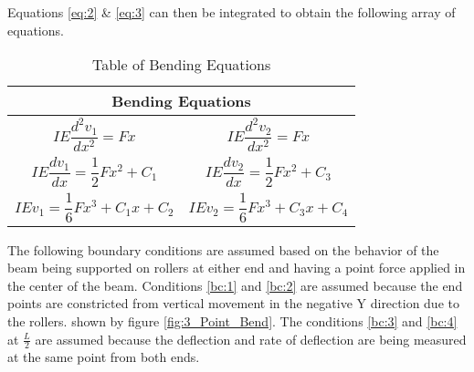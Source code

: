 Equations \ref{eq:2} \& \ref{eq:3} can then be integrated to obtain the following array of equations.

\begin{table} [h]
	\centering
	\begin{tabularx}{\textwidth}{| X X |}
	\multicolumn{2}{c}{\textbf{Bending Equations}} \\ \hline
	\vbox{\begin{equation} \label{eq:4} IE\frac{d^2v_1}{dx^2} = Fx \end{equation}} & \vbox{\begin{equation} \label{eq:7} IE\frac{d^2v_2}{dx^2} = Fx \end{equation}} \\
	\vbox{\begin{equation} \label{eq:5} IE\frac{dv_1}{dx} = \frac{1}{2}Fx^2 + C_1 \end{equation}} & \vbox{\begin{equation} \label{eq:8} IE\frac{dv_2}{dx} = \frac{1}{2}Fx^2 + C_3 \end{equation}}\\ 
	\vbox{\begin{equation} \label{eq:6} IEv_1 = \frac{1}{6}Fx^3 + C_1x + C_2  \end{equation}} & \vbox{\begin{equation} \label{eq:9} IEv_2 = \frac{1}{6}Fx^3 + C_3x + C_4 \end{equation}}\\ \hline
	\end{tabularx}
	\captionsetup{textformat=empty,labelformat=blank}
	\caption{Table of Bending Equations}
	\label{tab:bending}
\end{table}
\par

The following boundary conditions are assumed based on the behavior of the beam being supported on rollers at either end and having a point force applied in the center of the beam. Conditions \ref{bc:1} and \ref{bc:2} are assumed because the end points are constricted from vertical movement in the negative Y direction due to the rollers. shown by figure \ref{fig:3_Point_Bend}. The conditions \ref{bc:3} and \ref{bc:4} at $\frac{L}{2}$ are assumed because the deflection and rate of deflection are being measured at the same point from both ends.

